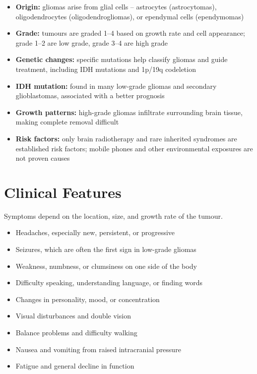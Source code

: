 \begin{itemize}
    \item \textbf{Origin:} gliomas arise from glial cells -- astrocytes (astrocytomas), oligodendrocytes (oligodendrogliomas), or ependymal cells (ependymomas)
    \item \textbf{Grade:} tumours are graded 1--4 based on growth rate and cell appearance; grade 1--2 are low grade, grade 3--4 are high grade
    \item \textbf{Genetic changes:} specific mutations help classify gliomas and guide treatment, including IDH mutations and 1p/19q codeletion
    \item \textbf{IDH mutation:} found in many low-grade gliomas and secondary glioblastomas, associated with a better prognosis
    \item \textbf{Growth patterns:} high-grade gliomas infiltrate surrounding brain tissue, making complete removal difficult
    \item \textbf{Risk factors:} only brain radiotherapy and rare inherited syndromes are established risk factors; mobile phones and other environmental exposures are not proven causes
\end{itemize}

\section*{Clinical Features}
Symptoms depend on the location, size, and growth rate of the tumour.

\begin{itemize}
    \item Headaches, especially new, persistent, or progressive
    \item Seizures, which are often the first sign in low-grade gliomas
    \item Weakness, numbness, or clumsiness on one side of the body
    \item Difficulty speaking, understanding language, or finding words
    \item Changes in personality, mood, or concentration
    \item Visual disturbances and double vision
    \item Balance problems and difficulty walking
    \item Nausea and vomiting from raised intracranial pressure
    \item Fatigue and general decline in function
\end{itemize}

